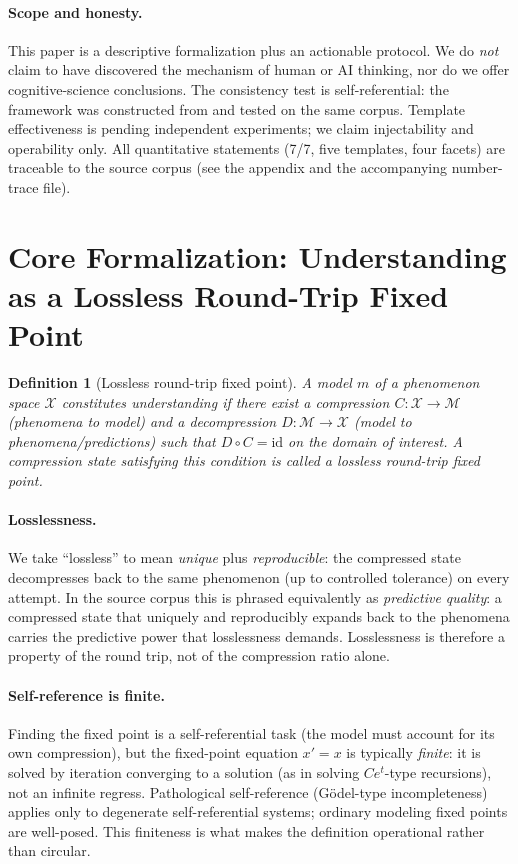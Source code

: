 \documentclass[11pt]{article}
\newtheorem{definition}{Definition}
\newcommand{\Cmap}{C}
\newcommand{\Dmap}{D}
\begin{document}
\paragraph{Scope and honesty.}
This paper is a descriptive formalization plus an actionable protocol. We do
\emph{not} claim to have discovered the mechanism of human or AI thinking, nor
do we offer cognitive-science conclusions. The consistency test is
self-referential: the framework was constructed from and tested on the same
corpus. Template effectiveness is pending independent experiments; we claim
injectability and operability only. All quantitative statements (7/7, five
templates, four facets) are traceable to the source corpus (see the appendix and
the accompanying number-trace file).
\section{Core Formalization: Understanding as a Lossless Round-Trip Fixed Point}
\label{sec:core}

\begin{definition}[Lossless round-trip fixed point]
\label{def:fixedpoint}
A model $m$ of a phenomenon space $\mathcal{X}$ constitutes \emph{understanding}
if there exist a compression $\Cmap:\mathcal{X}\to\mathcal{M}$ (phenomena to
model) and a decompression $\Dmap:\mathcal{M}\to\mathcal{X}$ (model to
phenomena/predictions) such that $\Dmap\circ\Cmap = \mathrm{id}$ on the domain of
interest. A compression state satisfying this condition is called a
\emph{lossless round-trip fixed point}.
\end{definition}

\paragraph{Losslessness.}
We take ``lossless'' to mean \emph{unique} plus \emph{reproducible}: the
compressed state decompresses back to the same phenomenon (up to controlled
tolerance) on every attempt. In the source corpus this is phrased equivalently
as \emph{predictive quality}: a compressed state that uniquely and reproducibly
expands back to the phenomena carries the predictive power that losslessness
demands. Losslessness is therefore a property of the round trip, not of the
compression ratio alone.

\paragraph{Self-reference is finite.}
Finding the fixed point is a self-referential task (the model must account for
its own compression), but the fixed-point equation $x' = x$ is typically
\emph{finite}: it is solved by iteration converging to a solution (as in solving
$Ce^{t}$-type recursions), not an infinite regress. Pathological self-reference
(G\"odel-type incompleteness) applies only to degenerate self-referential
systems; ordinary modeling fixed points are well-posed. This finiteness is what
makes the definition operational rather than circular.
\end{document}
